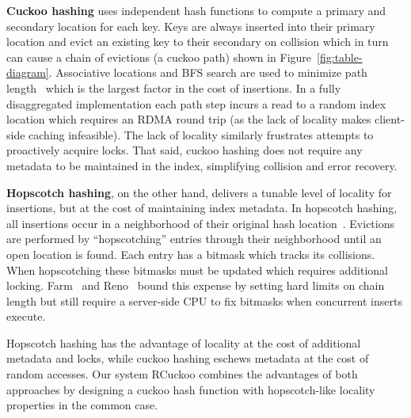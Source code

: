 \textbf{Cuckoo hashing} uses independent hash functions to compute a primary and secondary location
for each key. Keys are always inserted into their primary location and evict an existing key to
their secondary on collision which in turn can cause a chain of evictions (a cuckoo path) shown in
Figure~\ref{fig:table-diagram}. Associative locations and BFS search are used to minimize path
length~\cite{memc3,cuckoo-improvements} which is the largest factor in the cost of insertions. 
In a fully disaggregated implementation each path step incurs a read to a random index location
which requires an RDMA round trip (as the lack of locality makes client-side caching infeasible).  The lack of locality similarly frustrates attempts to proactively acquire locks.
That said, cuckoo hashing
does not require any metadata to be maintained in the index, simplifying collision and error recovery.

\textbf{Hopscotch hashing}, on the other hand, delivers a tunable
level of locality for insertions, but at the cost of maintaining index
metadata.  In hopscotch hashing, all insertions occur in a
neighborhood of their original hash
location~\cite{farm,hopscotch}. Evictions are performed by
``hopscotching'' entries through their neighborhood until an open
location is found.  Each entry has a bitmask which tracks its
collisions. When hopscotching these bitmasks must be updated which
requires additional locking.  Farm~\cite{farm} and Reno~\cite{reno}
bound this expense by setting hard limits on chain length but still
require a server-side CPU to fix bitmasks when concurrent inserts
execute.

Hopscotch hashing has the advantage of locality at the cost of additional metadata and locks, while
cuckoo hashing eschews metadata at the cost of random accesses. Our system RCuckoo combines the
advantages of both approaches by designing a cuckoo hash function with hopscotch-like locality
properties in the common case.




